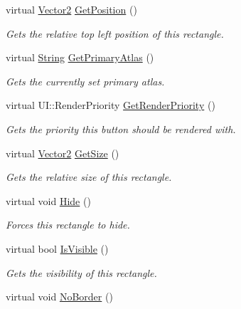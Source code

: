 \begin{DoxyCompactItemize}
virtual \hyperlink{classphys_1_1Vector2}{Vector2} \hyperlink{classphys_1_1UI_1_1Rectangle_aa0e2d6170f0b2d5b1f915c705e7fca10}{GetPosition} ()
\begin{DoxyCompactList}\small\item\em Gets the relative top left position of this rectangle. \item\end{DoxyCompactList}\item 
virtual \hyperlink{namespacephys_aa03900411993de7fbfec4789bc1d392e}{String} \hyperlink{classphys_1_1UI_1_1Rectangle_ab4fe2f73e386c9735ad17789ce6cc51a}{GetPrimaryAtlas} ()
\begin{DoxyCompactList}\small\item\em Gets the currently set primary atlas. \item\end{DoxyCompactList}\item 
virtual UI::RenderPriority \hyperlink{classphys_1_1UI_1_1Rectangle_a8445b7d0dcb2c92f29aeadac305af420}{GetRenderPriority} ()
\begin{DoxyCompactList}\small\item\em Gets the priority this button should be rendered with. \item\end{DoxyCompactList}\item 
virtual \hyperlink{classphys_1_1Vector2}{Vector2} \hyperlink{classphys_1_1UI_1_1Rectangle_a5f54debc5c435cda9505b40ce82f4f24}{GetSize} ()
\begin{DoxyCompactList}\small\item\em Gets the relative size of this rectangle. \item\end{DoxyCompactList}\item 
\hypertarget{classphys_1_1UI_1_1Rectangle_a25bad72cff62c5c69b224bcb74304661}{
virtual void \hyperlink{classphys_1_1UI_1_1Rectangle_a25bad72cff62c5c69b224bcb74304661}{Hide} ()}
\label{classphys_1_1UI_1_1Rectangle_a25bad72cff62c5c69b224bcb74304661}

\begin{DoxyCompactList}\small\item\em Forces this rectangle to hide. \item\end{DoxyCompactList}\item 
virtual bool \hyperlink{classphys_1_1UI_1_1Rectangle_aad47a2d9a7c9d8d9111b2edbf44541d5}{IsVisible} ()
\begin{DoxyCompactList}\small\item\em Gets the visibility of this rectangle. \item\end{DoxyCompactList}\item 
\hypertarget{classphys_1_1UI_1_1Rectangle_aebeea2052a72be49eb9dece731022c78}{
virtual void \hyperlink{classphys_1_1UI_1_1Rectangle_aebeea2052a72be49eb9dece731022c78}{NoBorder} ()}
\label{classphys_1_1UI_1_1Rectangle_aebeea2052a72be49eb9dece731022c78}


\end{DoxyCompactItemize}

